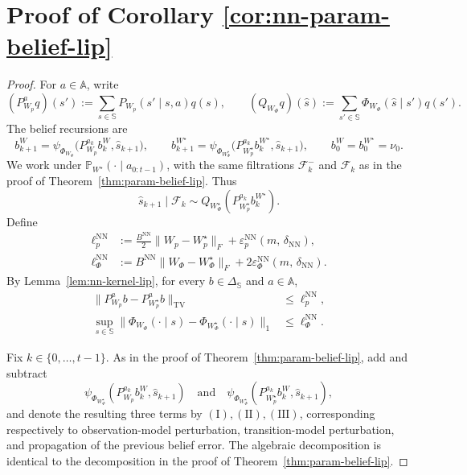 \documentclass[10pt]{article} %
\theoremstyle{plain}
\theoremstyle{definition}
\theoremstyle{remark}
\newcommand{\bA}{\mathbb{A}}
\newcommand{\bP}{\mathbb{P}}
\newcommand{\bS}{\mathbb{S}}
\begin{document}
\section{Proof of Corollary \ref{cor:nn-param-belief-lip}}
\begin{proof}\label{proof:belief-lip-nn}
For \(a\in\bA\), write
\[
(P_{W_p}^{a}q)(s'):=\sum_{s\in\bS}P_{W_p}(s'\mid s,a)q(s),\qquad
(Q_{W_\Phi}q)(\hat s):=\sum_{s'\in\bS}\Phi_{W_\Phi}(\hat s\mid s')q(s').
\]
The belief recursions are
\[
b_{k+1}^{W}=\psi_{\Phi_{W_\Phi}}\big(P_{W_p}^{a_k}b_k^W,\hat s_{k+1}\big),\qquad
b_{k+1}^{W^\star}=\psi_{\Phi_{W_\Phi^\star}}\big(P_{W_p^\star}^{a_k}b_k^{W^\star},\hat s_{k+1}\big),
\qquad b_0^W=b_0^{W^\star}=\nu_0 .
\]
We work under \(\bP_{W^\star}(\cdot\mid a_{0:t-1})\), with the same filtrations \(\mathcal F_k^-\) and \(\mathcal F_k\) as in the proof of Theorem~\ref{thm:param-belief-lip}. Thus
\[
\hat s_{k+1}\mid\mathcal F_k\sim Q_{W_\Phi^\star}\!\left(P_{W_p^\star}^{a_k}b_k^{W^\star}\right).
\]
Define
\begin{align}
\ell_p^{\mathrm{NN}}
&:=\frac{B^{\mathrm{NN}}}{2}\|W_p-W_p^\star\|_F+\varepsilon_{p}^{\mathrm{NN}}(m,\,\delta_{\mathrm{NN}}),\label{eq:ell-p-nn}\\
\ell_\Phi^{\mathrm{NN}}
&:=B^{\mathrm{NN}}\|W_\Phi-W_\Phi^\star\|_F+2\varepsilon_\Phi^{\mathrm{NN}}(m,\,\delta_{\mathrm{NN}}).\label{eq:ell-Phi-nn}
\end{align}
By Lemma~\ref{lem:nn-kernel-lip}, for every \(b\in\Delta_{\bS}\) and \(a\in\bA\),
\begin{align}
\bigl\|P_{W_p}^{a}b-P_{W_p^\star}^{a}b\bigr\|_{\mathrm{TV}}
&\le \ell_p^{\mathrm{NN}},\label{eq:nn-transition-mixture-bound}\\
\sup_{s\in\bS}\bigl\|\Phi_{W_\Phi}(\cdot\mid s)-\Phi_{W_\Phi^\star}(\cdot\mid s)\bigr\|_1
&\le \ell_\Phi^{\mathrm{NN}}.\label{eq:nn-observation-row-l1-bound}
\end{align}

Fix \(k\in\{0,\dots,t-1\}\). As in the proof of Theorem~\ref{thm:param-belief-lip}, add and subtract
\[
\psi_{\Phi_{W_\Phi^\star}}(P_{W_p}^{a_k}b_k^W,\hat s_{k+1})
\quad\text{and}\quad
\psi_{\Phi_{W_\Phi^\star}}(P_{W_p^\star}^{a_k}b_k^W,\hat s_{k+1}),
\]
and denote the resulting three terms by \(\mathrm{(I)},\mathrm{(II)},\mathrm{(III)}\), corresponding respectively to observation-model perturbation, transition-model perturbation, and propagation of the previous belief error. The algebraic decomposition is identical to the decomposition in the proof of Theorem~\ref{thm:param-belief-lip}.


\end{proof}
\end{document}
